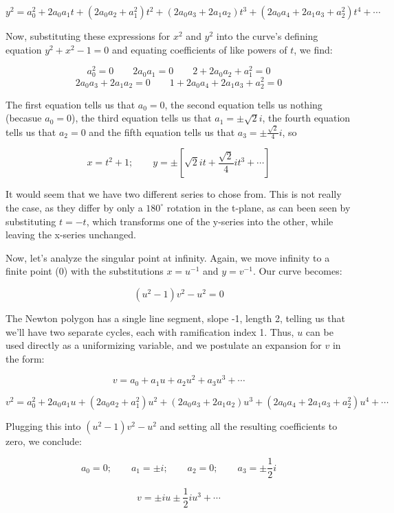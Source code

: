 $$y^2 = a_0^2 + 2 a_0 a_1 t + (2 a_0 a_2 + a_1^2) t^2 + (2 a_0 a_3 + 2 a_1 a_2) t^3 + (2 a_0 a_4 + 2 a_1 a_3 + a_2^2) t^4 + \cdots$$

Now, substituting these expressions for $x^2$ and $y^2$ into the
curve's defining equation $y^2 + x^2 - 1 = 0$ and equating coefficients
of like powers of $t$, we find:

$$a_0^2=0 \qquad 2 a_0 a_1 = 0 \qquad 2 + 2 a_0 a_2 + a_1^2 = 0$$
$$2 a_0 a_3 + 2 a_1 a_2 = 0 \qquad 1 + 2 a_0 a_4 + 2 a_1 a_3 + a_2^2 = 0$$

The first equation tells us that $a_0 = 0$, the second equation tells
us nothing (becasue $a_0=0$), the third equation tells us that $a_1
= \pm\sqrt{2}i$, the fourth equation tells us that $a_2=0$ and the
fifth equation tells us that $a_3 = \pm \frac{\sqrt{2}}{4} i$, so


$$x = t^2 +1; \qquad y = \pm\left[ \sqrt{2}it + \frac{\sqrt{2}}{4} it^3 + \cdots \right]$$

It would seem that we have two different series to chose from.  This
is not really the case, as they differ by only a $180^\circ$ rotation
in the t-plane, as can been seen by substituting $t=-t$, which
transforms one of the y-series into the other, while leaving the
x-series unchanged.

Now, let's analyze the singular point at infinity.  Again, we move
infinity to a finite point (0) with the substitutions $x=u^{-1}$ and
$y=v^{-1}$.  Our curve becomes:

$$(u^2 - 1) v^2 - u^2 = 0$$

The Newton polygon has a single line segment, slope -1, length 2,
telling us that we'll have two separate cycles, each with ramification
index 1.  Thus, $u$ can be used directly as a uniformizing variable,
and we postulate an expansion for $v$ in the form:

$$v = a_0 + a_1 u + a_2 u^2 + a_3 u^3 + \cdots$$

$$v^2 = a_0^2 + 2 a_0 a_1 u + (2 a_0 a_2 + a_1^2) u^2 + (2 a_0 a_3 + 2 a_1 a_2) u^3 + (2 a_0 a_4 + 2 a_1 a_3 + a_2^2) u^4 + \cdots$$

Plugging this into $(u^2 - 1) v^2 - u^2$ and setting all the resulting
coefficients to zero, we conclude:

$$a_0 = 0; \qquad a_1 = \pm i; \qquad a_2 = 0; \qquad a_3 = \pm \frac{1}{2}i$$

$$v = \pm i u \pm \frac{1}{2} i u^3 + \cdots$$

